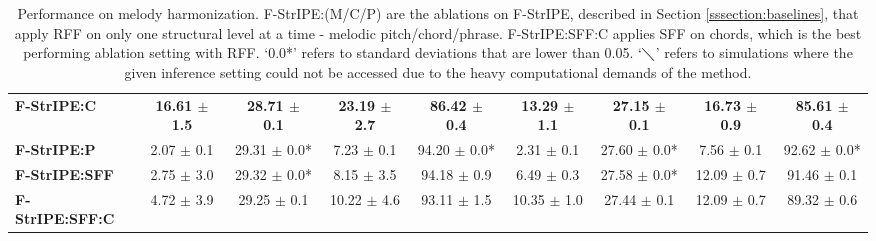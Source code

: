 \begin{table*}[t]
{\begin{tabular}{lcccccccc}
\multicolumn{1}{l|}{\textbf{F-StrIPE:C}} & \textbf{16.61 $\pm$ 1.5\phantom{*}} & \textbf{28.71 $\pm$ 0.1\phantom{*}} & \textbf{23.19 $\pm$ 2.7\phantom{*}} & \multicolumn{1}{c|}{\textbf{86.42 $\pm$ 0.4\phantom{*}}} & \textbf{13.29 $\pm$ 1.1} & \textbf{27.15 $\pm$ 0.1\phantom{*}} & \textbf{16.73 $\pm$ 0.9} & \multicolumn{1}{c}{\textbf{85.61 $\pm$ 0.4\phantom{*}}} \\
\multicolumn{1}{l|}{\textbf{F-StrIPE:P}} & \phantom{0}2.07 $\pm$ 0.1\phantom{*} & 29.31 $\pm$ 0.0* & \phantom{0}7.23 $\pm$ 0.1\phantom{*} & \multicolumn{1}{c|}{94.20 $\pm$ 0.0*} & \phantom{0}2.31 $\pm$ 0.1 & 27.60 $\pm$ 0.0* & \phantom{0}7.56 $\pm$ 0.1 & \multicolumn{1}{c}{92.62 $\pm$ 0.0*} \\ \hline
\multicolumn{1}{l|}{\textbf{F-StrIPE:SFF}} & \phantom{0}2.75 $\pm$ 3.0\phantom{*} & 29.32 $\pm$ 0.0* & \phantom{0}8.15 $\pm$ 3.5\phantom{*} & \multicolumn{1}{c|}{94.18 $\pm$ 0.9\phantom{*}} & \phantom{0}6.49 $\pm$ 0.3 & 27.58 $\pm$ 0.0* & 12.09 $\pm$ 0.7 & \multicolumn{1}{c}{91.46 $\pm$ 0.1\phantom{*}} \\ %
\multicolumn{1}{l|}{\textbf{F-StrIPE:SFF:C}} & \phantom{0}4.72 $\pm$ 3.9\phantom{*} & 29.25 $\pm$ 0.1\phantom{*} & 10.22 $\pm$ 4.6\phantom{*} & \multicolumn{1}{c|}{93.11 $\pm$ 1.5\phantom{*}} & 10.35 $\pm$ 1.0 & 27.44 $\pm$ 0.1\phantom{*} & 12.09 $\pm$ 0.7 & \multicolumn{1}{c}{89.32 $\pm$ 0.6\phantom{*}} \\ \hline
\end{tabular}
}
\caption{Performance on melody harmonization. F-StrIPE:(M/C/P) are the ablations on F-StrIPE, described in Section \ref{sssection:baselines}, that apply RFF on only one structural level at a time - melodic pitch/chord/phrase. F-StrIPE:SFF:C applies SFF on chords, which is the best performing ablation setting with RFF. `0.0*' refers to standard deviations that are lower than 0.05. `$\diagdown$' refers to simulations where the given inference setting could not be accessed due to the heavy computational demands of the method.}
\label{tab:results_unrounded}
\end{table*}